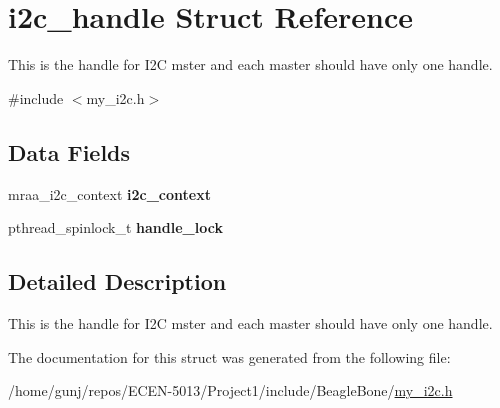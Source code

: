 \hypertarget{structi2c__handle}{}\section{i2c\+\_\+handle Struct Reference}
\label{structi2c__handle}


This is the handle for I2C mster and each master should have only one handle.  




{\ttfamily \#include $<$my\+\_\+i2c.\+h$>$}

\subsection*{Data Fields}
\begin{DoxyCompactItemize}
\item 
mraa\+\_\+i2c\+\_\+context {\bfseries i2c\+\_\+context}\hypertarget{structi2c__handle_aa381f1dd467b2f93f7283854e8f3ebca}{}\label{structi2c__handle_aa381f1dd467b2f93f7283854e8f3ebca}

\item 
pthread\+\_\+spinlock\+\_\+t {\bfseries handle\+\_\+lock}\hypertarget{structi2c__handle_aaf1918ec0bdd529f793b5d3850280229}{}\label{structi2c__handle_aaf1918ec0bdd529f793b5d3850280229}

\end{DoxyCompactItemize}


\subsection{Detailed Description}
This is the handle for I2C mster and each master should have only one handle. 

The documentation for this struct was generated from the following file\+:\begin{DoxyCompactItemize}
\item 
/home/gunj/repos/\+E\+C\+E\+N-\/5013/\+Project1/include/\+Beagle\+Bone/\hyperlink{my__i2c_8h}{my\+\_\+i2c.\+h}\end{DoxyCompactItemize}
